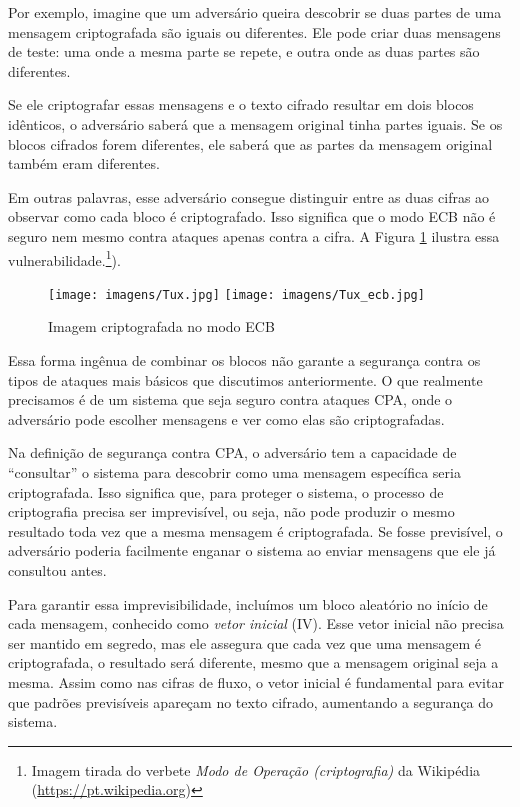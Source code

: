 Por exemplo, imagine que um adversário queira descobrir se duas partes de uma mensagem criptografada são iguais ou diferentes.
Ele pode criar duas mensagens de teste:
uma onde a mesma parte se repete, e outra onde as duas partes são diferentes.

Se ele criptografar essas mensagens e o texto cifrado resultar em dois blocos idênticos, o adversário saberá que a mensagem original tinha partes iguais.
Se os blocos cifrados forem diferentes, ele saberá que as partes da mensagem original também eram diferentes.

Em outras palavras, esse adversário consegue distinguir entre as duas cifras ao observar como cada bloco é criptografado.
Isso significa que o modo ECB não é seguro nem mesmo contra ataques apenas contra a cifra.
A Figura \ref{fig:ecb-exemplo} ilustra essa vulnerabilidade.\footnote{Imagem tirada do verbete {\em Modo de Operação (criptografia)} da Wikipédia (\url{https://pt.wikipedia.org})}).

\begin{figure}[!htp]
  \label{fig:ecb-exemplo}
  \centering
  \texttt{[image: imagens/Tux.jpg]}
  \texttt{[image: imagens/Tux\_ecb.jpg]}
  \caption{Imagem criptografada no modo ECB}
\end{figure}

Essa forma ingênua de combinar os blocos não garante a segurança contra os tipos de ataques mais básicos que discutimos anteriormente.
O que realmente precisamos é de um sistema que seja seguro contra ataques CPA, onde o adversário pode escolher mensagens e ver como elas são criptografadas.

Na definição de segurança contra CPA, o adversário tem a capacidade de ``consultar'' o sistema para descobrir como uma mensagem específica seria criptografada.
Isso significa que, para proteger o sistema, o processo de criptografia precisa ser imprevisível, ou seja, não pode produzir o mesmo resultado toda vez que a mesma mensagem é criptografada.
Se fosse previsível, o adversário poderia facilmente enganar o sistema ao enviar mensagens que ele já consultou antes.

Para garantir essa imprevisibilidade, incluímos um bloco aleatório no início de cada mensagem, conhecido como {\em vetor inicial} (IV).
Esse vetor inicial não precisa ser mantido em segredo, mas ele assegura que cada vez que uma mensagem é criptografada, o resultado será diferente, mesmo que a mensagem original seja a mesma.
Assim como nas cifras de fluxo, o vetor inicial é fundamental para evitar que padrões previsíveis apareçam no texto cifrado, aumentando a segurança do sistema.

